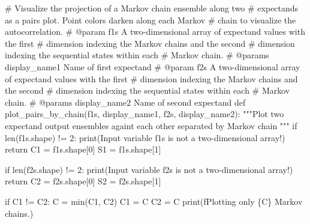 \documentclass[
  letterpaper,
  DIV=11,
  numbers=noendperiod]{scrartcl}
\newenvironment{Shaded}{\begin{snugshade}}{\end{snugshade}}
\newcommand{\BuiltInTok}[1]{\textcolor[rgb]{0.00,0.23,0.31}{#1}}
\newcommand{\CommentTok}[1]{\textcolor[rgb]{0.37,0.37,0.37}{#1}}
\newcommand{\ControlFlowTok}[1]{\textcolor[rgb]{0.00,0.23,0.31}{#1}}
\newcommand{\DecValTok}[1]{\textcolor[rgb]{0.68,0.00,0.00}{#1}}
\newcommand{\KeywordTok}[1]{\textcolor[rgb]{0.00,0.23,0.31}{#1}}
\newcommand{\NormalTok}[1]{\textcolor[rgb]{0.00,0.23,0.31}{#1}}
\newcommand{\OperatorTok}[1]{\textcolor[rgb]{0.37,0.37,0.37}{#1}}
\newcommand{\SpecialCharTok}[1]{\textcolor[rgb]{0.37,0.37,0.37}{#1}}
\newcommand{\SpecialStringTok}[1]{\textcolor[rgb]{0.13,0.47,0.30}{#1}}
\newcommand{\StringTok}[1]{\textcolor[rgb]{0.13,0.47,0.30}{#1}}
\begin{document}
\begin{Shaded}
\begin{Highlighting}[]
\CommentTok{\# Visualize the projection of a Markov chain ensemble along two }
\CommentTok{\# expectands as a pairs plot.  Point colors darken along each Markov }
\CommentTok{\# chain to visualize the autocorrelation.}
\CommentTok{\# @param f1s A two{-}dimensional array of expectand values with the first }
\CommentTok{\#            dimension indexing the Markov chains and the second }
\CommentTok{\#            dimension indexing the sequential states  within each }
\CommentTok{\#            Markov chain.}
\CommentTok{\# @params display\_name1 Name of first expectand}
\CommentTok{\# @param f2s A two{-}dimensional array of expectand values with the first }
\CommentTok{\#            dimension indexing the Markov chains and the second }
\CommentTok{\#            dimension indexing the sequential states  within each }
\CommentTok{\#            Markov chain.}
\CommentTok{\# @params display\_name2 Name of second expectand}
\KeywordTok{def}\NormalTok{ plot\_pairs\_by\_chain(f1s, display\_name1,}
\NormalTok{                        f2s, display\_name2):}
  \CommentTok{"""Plot two expectand output ensembles againt each other separated by}
\CommentTok{     Markov chain """}
  \ControlFlowTok{if} \BuiltInTok{len}\NormalTok{(f1s.shape) }\OperatorTok{!=} \DecValTok{2}\NormalTok{:}
    \BuiltInTok{print}\NormalTok{(}\StringTok{\textquotesingle{}Input variable \textasciigrave{}f1s\textasciigrave{} is not a two{-}dimensional array!\textquotesingle{}}\NormalTok{)}
    \ControlFlowTok{return}
\NormalTok{  C1 }\OperatorTok{=}\NormalTok{ f1s.shape[}\DecValTok{0}\NormalTok{]}
\NormalTok{  S1 }\OperatorTok{=}\NormalTok{ f1s.shape[}\DecValTok{1}\NormalTok{]}
  
  \ControlFlowTok{if} \BuiltInTok{len}\NormalTok{(f2s.shape) }\OperatorTok{!=} \DecValTok{2}\NormalTok{:}
    \BuiltInTok{print}\NormalTok{(}\StringTok{\textquotesingle{}Input variable \textasciigrave{}f2s\textasciigrave{} is not a two{-}dimensional array!\textquotesingle{}}\NormalTok{)}
    \ControlFlowTok{return}
\NormalTok{  C2 }\OperatorTok{=}\NormalTok{ f2s.shape[}\DecValTok{0}\NormalTok{]}
\NormalTok{  S2 }\OperatorTok{=}\NormalTok{ f2s.shape[}\DecValTok{1}\NormalTok{]}
    
  \ControlFlowTok{if}\NormalTok{ C1 }\OperatorTok{!=}\NormalTok{ C2:}
\NormalTok{    C }\OperatorTok{=} \BuiltInTok{min}\NormalTok{(C1, C2)}
\NormalTok{    C1 }\OperatorTok{=}\NormalTok{ C}
\NormalTok{    C2 }\OperatorTok{=}\NormalTok{ C}
    \BuiltInTok{print}\NormalTok{(}\SpecialStringTok{f\textquotesingle{}Plotting only }\SpecialCharTok{\{}\NormalTok{C}\SpecialCharTok{\}}\SpecialStringTok{ Markov chains.\textquotesingle{}}\NormalTok{)}
  

\end{Highlighting}
\end{Shaded}
\end{document}
